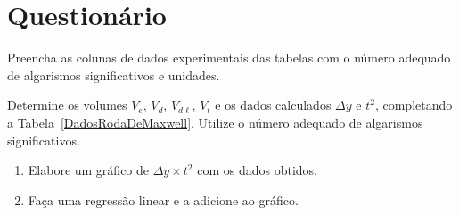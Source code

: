 \begin{fullwidth}
\noindent{}
\vspace{5mm}

\noindent{}

\noindent{}

\noindent{}

\noindent{}

\noindent{}
\end{fullwidth}

\vspace{5mm}

\section{Questionário}

\begin{question}[type={exam}]
Preencha as colunas de dados experimentais das tabelas com o número adequado de algarismos significativos e unidades.
\end{question}

\begin{question}[type={exam}]
Determine os volumes $V_e$, $V_d$, $V_{d\ell}$, $V_t$ e os dados calculados $\Delta y$ e $t^2$, completando a Tabela~\ref{DadosRodaDeMaxwell}. Utilize o número adequado de algarismos significativos.
\end{question}

\begin{question}[type={exam}]
\begin{enumerate}[label=\roman*.]
    \item Elabore um gráfico de $\Delta y \times t^2$ com os dados obtidos.
    \item Faça uma regressão linear e a adicione ao gráfico.
\end{enumerate}
\end{question}

